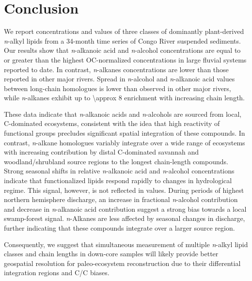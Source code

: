 \section{Conclusion}

We report concentrations and  values of three classes of dominantly plant-derived \textit{n}-alkyl lipids from a 34-month time series of Congo River suspended sediments. Our results show that \textit{n}-alkanoic acid and \textit{n}-alcohol concentrations are equal to or greater than the highest OC-normalized concentrations in large fluvial systems reported to date. In contrast, \textit{n}-alkanes concentrations are lower than those reported in other major rivers. Spread in \textit{n}-alcohol and \textit{n}-alkanoic acid  values between long-chain homologues is lower than observed in other major rivers, while \textit{n}-alkanes exhibit up to \SI{\approx 8}{\permil} enrichment with increasing chain length.

These data indicate that \textit{n}-alkanoic acids and \textit{n}-alcohols are sourced from local, C-dominated ecosystems, consistent with the idea that high reactivity of functional groups precludes significant spatial integration of these compounds. In contrast, \textit{n}-alkane homologues variably integrate over a wide range of ecosystems with increasing contribution by distal C-dominated savannah and woodland/shrubland source regions to the longest chain-length compounds. Strong seasonal shifts in relative \textit{n}-alkanoic acid and \textit{n}-alcohol concentrations indicate that functionalized lipids respond rapidly to changes in hydrological regime. This signal, however, is not reflected in  values. During periods of highest northern hemisphere discharge, an increase in fractional \textit{n}-alcohol contribution and decrease in \textit{n}-alkanoic acid contribution suggest a strong bias towards a local swamp-forest signal. \textit{n}-Alkanes are less affected by seasonal changes in discharge, further indicating that these compounds integrate over a larger source region.

Consequently, we suggest that simultaneous measurement of multiple \textit{n}-alkyl lipid classes and chain lengths in down-core samples will likely provide better geospatial resolution for paleo-ecosystem reconstruction due to their differential integration regions and C/C biases.


